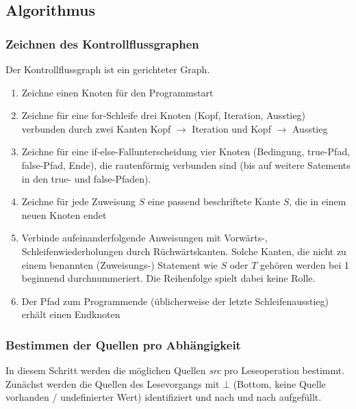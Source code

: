 \subsection{Algorithmus}
\subsubsection{Zeichnen des Kontrollflussgraphen}
Der Kontrollflussgraph ist ein gerichteter Graph.
\begin{enumerate}
    \item Zeichne einen Knoten für den Programmstart
    \item Zeichne für eine for-Schleife drei Knoten (Kopf, Iteration, Ausstieg) verbunden durch zwei Kanten Kopf $\rightarrow$ Iteration und Kopf $\rightarrow$ Ausstieg
    \item Zeichne für eine if-else-Fallunterscheidung vier Knoten (Bedingung, true-Pfad, false-Pfad, Ende), die rautenförmig verbunden sind (bis auf weitere Satements in den true- und false-Pfaden).
    \item Zeichne für jede Zuweisung $S$ eine passend beschriftete Kante $S$, die in einem neuen Knoten endet
    \item Verbinde aufeinanderfolgende Anweisungen mit Vorwärts-, Schleifenwiederholungen durch Rüchwärtskanten.
        Solche Kanten, die nicht zu einem benannten (Zuweisungs-) Statement wie $S$ oder $T$ gehören werden bei 1 beginnend durchnummeriert. Die Reihenfolge spielt dabei keine Rolle.
    \item Der Pfad zum Programmende (üblicherweise der letzte Schleifenausstieg) erhält einen Endknoten
\end{enumerate}

\subsubsection{Bestimmen der Quellen pro Abhängigkeit}
In diesem Schritt werden die möglichen Quellen \textit{src} pro Leseoperation bestimmt. Zunächst werden die Quellen des Lesevorgangs mit $\bot$ (Bottom, keine Quelle vorhanden / undefinierter Wert) identifiziert und nach und nach aufgefüllt.

